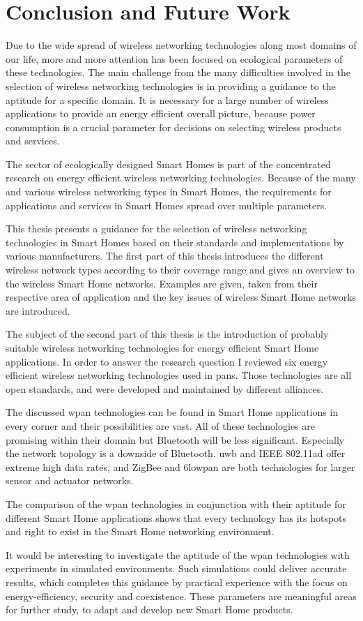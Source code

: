 \chapter{Conclusion and Future Work}
\label{ch:conclusion}

Due to the wide spread of wireless networking technologies along most domains of our life, more and more attention has been focused on ecological parameters of these technologies. The main challenge from the many difficulties involved in the selection of wireless networking technologies is in providing a guidance to the aptitude for a specific domain. It is necessary for a large number of wireless applications to provide an energy efficient overall picture, because power consumption is a crucial parameter for decisions on selecting wireless products and services.

The sector of ecologically designed Smart Homes is part of the concentrated research on energy efficient wireless networking technologies. Because of the many and various wireless networking types in Smart Homes, the requirements for applications and services in Smart Homes spread over multiple parameters.

This thesis presents a guidance for the selection of wireless networking technologies in Smart Homes based on their standards and implementations by various manufacturers. The first part of this thesis introduces the different wireless network types according to their coverage range and gives an overview to the wireless Smart Home networks. Examples are given, taken from their respective area of application and the key issues of wireless Smart Home networks are introduced.

The subject of the second part of this thesis is the introduction of probably suitable wireless networking technologies for energy efficient Smart Home applications. In order to answer the research question I reviewed six energy efficient wireless networking technologies used in \glspl{pan}. Those technologies are all open standards, and were developed and maintained by different alliances.

The discussed \gls{wpan} technologies can be found in Smart Home applications in every corner and their possibilities are vast. All of these technologies are promising within their domain but Bluetooth will be less significant. Especially the network topology is a downside of Bluetooth. \gls{uwb} and IEEE 802.11ad offer extreme high data rates, and ZigBee and \gls{6lowpan} are both technologies for larger sensor and actuator networks.

The comparison of the \gls{wpan} technologies in conjunction with their aptitude for different Smart Home applications shows that every technology has its hotspots and right to exist in the Smart Home networking environment.

It would be interesting to investigate the aptitude of the \gls{wpan} technologies with experiments in simulated environments. Such simulations could deliver accurate results, which completes this guidance by practical experience with the focus on energy-efficiency, security and coexistence. These parameters are meaningful areas for further study, to adapt and develop new Smart Home products.
